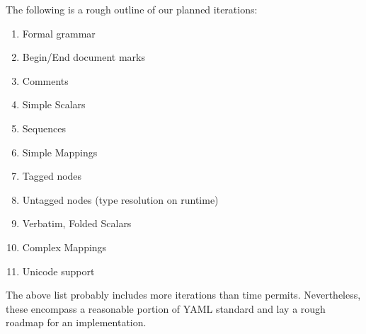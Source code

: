 \documentclass{article}
\begin{document}
The following is a rough outline of our planned iterations:

\begin{enumerate}
  \item Formal grammar
  \item Begin/End document marks
  \item Comments
  \item Simple Scalars
  \item Sequences
  \item Simple Mappings
  \item Tagged nodes
  \item Untagged nodes (type resolution on runtime)
  \item Verbatim, Folded Scalars
  \item Complex Mappings
  \item Unicode support
\end{enumerate}

The above list probably includes more iterations than time permits.  Nevertheless, these encompass a reasonable portion of YAML standard and lay a rough roadmap for an implementation.
\end{document}
